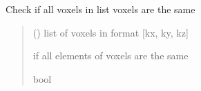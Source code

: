 \documentclass[letterpaper,10pt,english]{sphinxmanual}
\begin{document}
\begin{fulllineitems}
\label{\detokenize{reference:tesselator.samevoxel}}
\pysigstartsignatures
{}
\pysigstopsignatures
\sphinxAtStartPar
Check if all voxels in list voxels are the same
\begin{quote}\begin{description}
\sphinxAtStartPar
{} () \textendash{} list of voxels in format {[}kx, ky, kz{]}

\sphinxAtStartPar
if all elements of voxels are the same

\sphinxAtStartPar
bool

\end{description}\end{quote}

\end{fulllineitems}

\end{document}
